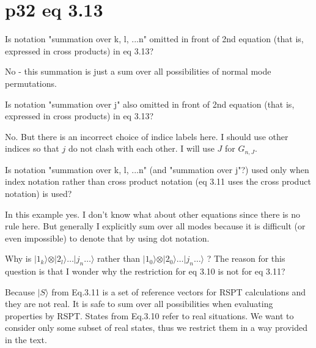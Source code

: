 \documentclass{exam}
\begin{document}
\section{p32 eq 3.13}

\begin{questions}
\question Is notation "summation over k, l, ...n" omitted in front of 2nd equation 
(that is, expressed in cross products) in eq 3.13?

\begin{solution}
No - this summation is just a sum over all possibilities of normal mode permutations.
\end{solution}

\question Is notation "summation over j" also omitted in front of 2nd equation (that is, expressed in cross products) in eq 3.13?

\begin{solution}
No. But there is an incorrect choice of indice labels here. I should use other indices so that $j$ do not clash with each other.
I will use $J$ for $G_{n,J}$.
\end{solution}

\question Is notation "summation over k, l, ...n" (and "summation over j"?) 
used only when index notation rather than cross product notation (eq 3.11 uses the cross product notation) is used?

\begin{solution}
In this example yes. I don't know what about other equations since there is no rule here. But generally
I explicitly sum over all modes because it is difficult (or even impossible) to denote that by using
dot notation.
\end{solution}

\question Why is $\vert 1_k \rangle \otimes \vert 2_l \rangle \ldots \vert j_n \ldots \rangle $
rather than $\vert 1_0 \rangle \otimes \vert 2_0 \rangle \ldots \vert j_n \ldots \rangle $ ? 
The reason for this question is that I wonder why the restriction for eq 3.10 is not for eq 3.11?

\begin{solution}
Because $\vert S \rangle$ from Eq.3.11 is a set of reference vectors for RSPT calculations and they are not real.
It is safe to sum over all possibilities when evaluating properties by RSPT.
States from Eq.3.10 refer to real situations. We want to consider only some subset of real states, thus we
restrict them in a way provided in the text.
\end{solution}

\end{questions}
\end{document}

